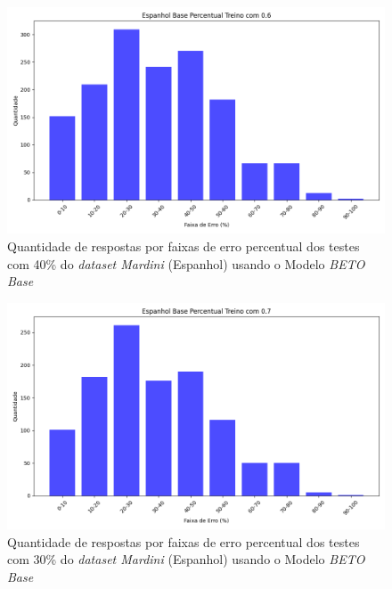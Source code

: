 \begin{figure}[h!]
\includegraphics[width=\textwidth]{img/grafsEsp/Espanhol Base Percentual Treino com 0.6_quantidade.png}
\caption{Quantidade de respostas por faixas de erro percentual dos testes com 40\% do \textit{dataset Mardini} (Espanhol) usando o Modelo \textit{BETO Base}}\label{figure:4}
\end{figure}

\begin{figure}[h!]
\includegraphics[width=\textwidth]{img/grafsEsp/Espanhol Base Percentual Treino com 0.7_quantidade.png}
\caption{Quantidade de respostas por faixas de erro percentual dos testes com 30\% do \textit{dataset Mardini} (Espanhol) usando o Modelo \textit{BETO Base}}\label{figure:5}
\end{figure}

